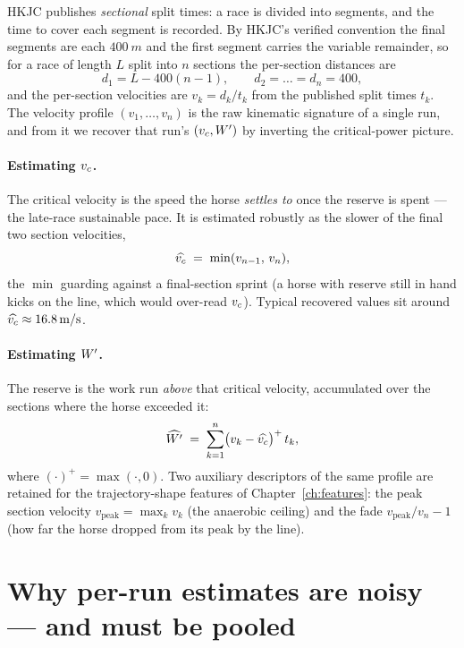 HKJC publishes \emph{sectional} split times: a race is divided into segments, and the time to
cover each segment is recorded. By HKJC's verified convention the final segments are each
$\SI{400}{m}$ and the first segment carries the variable remainder, so for a race of length $L$
split into $n$ sections the per-section distances are
\begin{equation}
  d_1 = L - 400(n-1), \qquad d_2=\dots=d_n = 400,
  \label{eq:sectiondist}
\end{equation}
and the per-section velocities are $v_k = d_k / t_k$ from the published split times $t_k$. The
velocity profile $(v_1,\dots,v_n)$ is the raw kinematic signature of a single run, and from it we
recover that run's $({v_{c}},{W^{\prime}})$ by inverting the critical-power picture.

\paragraph{Estimating ${v_{c}}$.} The critical velocity is the speed the horse \emph{settles to}
once the reserve is spent --- the late-race sustainable pace. It is estimated robustly as the
slower of the final two section velocities,
\begin{equation}
  \widehat{{v_{c}}} \;=\; \min(v_{n-1},\, v_{n}),
  \label{eq:vc-est}
\end{equation}
the $\min$ guarding against a final-section sprint (a horse with reserve still in hand kicks on
the line, which would over-read ${v_{c}}$). Typical recovered values sit around
$\widehat{{v_{c}}}\approx \SI{16.8}{m/s}$.

\paragraph{Estimating ${W^{\prime}}$.} The reserve is the work run \emph{above} that critical velocity,
accumulated over the sections where the horse exceeded it:
\begin{equation}
  \widehat{{W^{\prime}}} \;=\; \sum_{k=1}^{n} \bigl(v_k - \widehat{{v_{c}}}\bigr)^{+}\, t_k,
  \label{eq:wp-est}
\end{equation}
where $(\cdot)^{+}=\max(\cdot,0)$. Two auxiliary descriptors of the same profile are retained for
the trajectory-shape features of Chapter~\ref{ch:features}: the peak section velocity
$v_{\text{peak}}=\max_k v_k$ (the anaerobic ceiling) and the fade
$v_{\text{peak}}/v_n - 1$ (how far the horse dropped from its peak by the line).

\section{Why per-run estimates are noisy --- and must be pooled}

